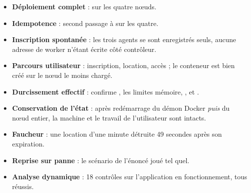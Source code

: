 \begin{itemize}
\item \textbf{Déploiement complet} :  sur les quatre nœuds.
\item \textbf{Idempotence} : second passage à  sur les quatre.
\item \textbf{Inscription spontanée} : les trois agents se sont enregistrés
  seuls, aucune adresse de worker n'étant écrite côté contrôleur.
\item \textbf{Parcours utilisateur} : inscription, location, accès ; le
  conteneur est bien créé sur le nœud le moins chargé.
\item \textbf{Durcissement effectif} :  confirme
  , les limites mémoire, ,
   et .
\item \textbf{Conservation de l'état} : après redémarrage du démon Docker
  \emph{puis} du nœud entier, la machine et le travail de l'utilisateur sont
  intacts.
\item \textbf{Faucheur} : une location d'une minute détruite 49 secondes après
  son expiration.
\item \textbf{Reprise sur panne} : le scénario de l'énoncé joué tel quel.
\item \textbf{Analyse dynamique} : 18 contrôles sur l'application en
  fonctionnement, tous réussis.
\end{itemize}
